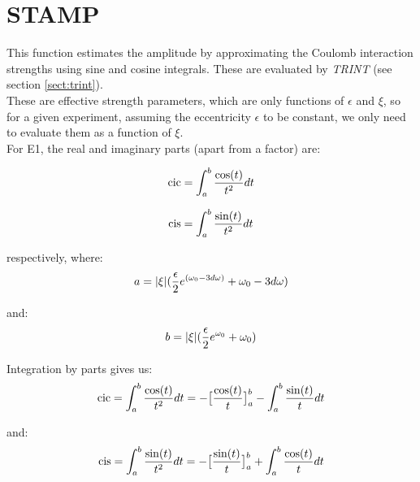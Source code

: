 \section{STAMP}
\label{sect:stamp}

\noindent This function estimates the amplitude by approximating the Coulomb
interaction strengths using sine and cosine integrals. These are evaluated by
{\em TRINT} (see section \ref{sect:trint}).\\

\noindent These are effective strength parameters, which are only functions
of $\epsilon$ and $\xi$, so for a given experiment, assuming the
eccentricity $\epsilon$ to be constant, we only need to evaluate them as a
function of $\xi$.\\

\noindent For E1, the real and imaginary parts (apart from a factor) are:

\begin{equation}
\mathrm{cic} = \int_a^b {\cos(t) \over t^2} dt
\end{equation}

\begin{equation}
\mathrm{cis} = \int_a^b {\sin(t) \over t^2} dt
\end{equation}

\noindent respectively, where:\\

\begin{equation}
a = |\xi| ({\epsilon \over 2} e^{(\omega_0 - 3 d\omega)} + \omega_0 - 3
d\omega)
\end{equation}

\noindent and:\\

\begin{equation}
b = |\xi| ({\epsilon \over 2} e^{\omega_0} + \omega_0)
\end{equation}

\noindent Integration by parts gives us:\\

\begin{equation}
\mathrm{cic} = \int_a^b {\cos(t) \over t^2} dt = -\big[{\cos(t) \over t} \big]_a^b
- \int_a^b {\sin(t) \over t} dt
\end{equation}

\noindent and:\\

\begin{equation}
\mathrm{cis} = \int_a^b {\sin(t) \over t^2} dt = -\big[{\sin(t) \over t} \big]_a^b
+ \int_a^b {\cos(t) \over t} dt
\end{equation}

